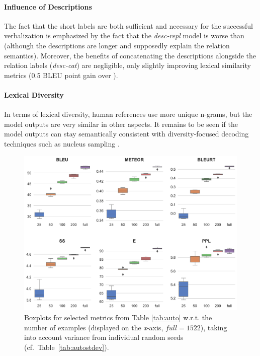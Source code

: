 \paragraph{Influence of Descriptions} The fact that the short labels are both sufficient and necessary for the successful verbalization is emphasized by the fact that the \textit{desc-repl} model is worse than \BARTr{} (although the descriptions are longer and supposedly explain the relation semantics). Moreover, the benefits of concatenating the descriptions alongside the relation labels (\textit{desc-cat}) are negligible, only slightly improving lexical similarity metrics (0.5 BLEU point gain over \BARTr{}).

\paragraph{Lexical Diversity} In terms of lexical diversity, human references use more unique n-grams, but the model outputs are very similar in other aspects. It remains to be seen if the model outputs can stay semantically consistent with diversity-focused decoding techniques such as nucleus sampling \cite{holtzman2019curious}.

\begin{figure}[t]
    \centering
    \includegraphics[width=\textwidth]{img/rel2text-fewshot.pdf}
    \caption{Boxplots for selected metrics from Table \ref{tab:auto} w.r.t. the number of examples (displayed on the \textit{x}-axis, $\textit{full} = 1522$), taking into account variance from individual random seeds (cf.\ Table~\ref{tab:autostdev}).}\label{fig:rel2text:fewshot}
\end{figure}

